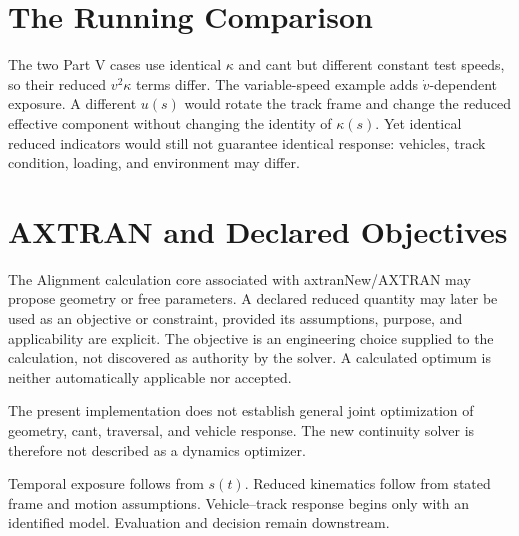 \section{The Running Comparison}

The two Part V cases use identical \(\kappa\) and cant but different constant
test speeds, so their reduced \(v^2\kappa\) terms differ. The variable-speed
example adds \(\dot v\)-dependent exposure. A different \(u(s)\) would rotate
the track frame and change the reduced effective component without changing
the identity of \(\kappa(s)\). Yet identical reduced indicators would still
not guarantee identical response: vehicles, track condition, loading, and
environment may differ.

\section{AXTRAN and Declared Objectives}

The Alignment calculation core associated with axtranNew/AXTRAN may propose
geometry or free parameters. A declared reduced quantity may later be used as
an objective or constraint, provided its assumptions, purpose, and
applicability are explicit. The objective is an engineering choice supplied
to the calculation, not discovered as authority by the solver. A calculated
optimum is neither automatically applicable nor accepted.

The present implementation does not establish general joint optimization of
geometry, cant, traversal, and vehicle response. The new continuity solver is
therefore not described as a dynamics optimizer.

\begin{summary}
Temporal exposure follows from \(s(t)\). Reduced kinematics follow from stated
frame and motion assumptions. Vehicle--track response begins only with an
identified model. Evaluation and decision remain downstream.
\end{summary}
